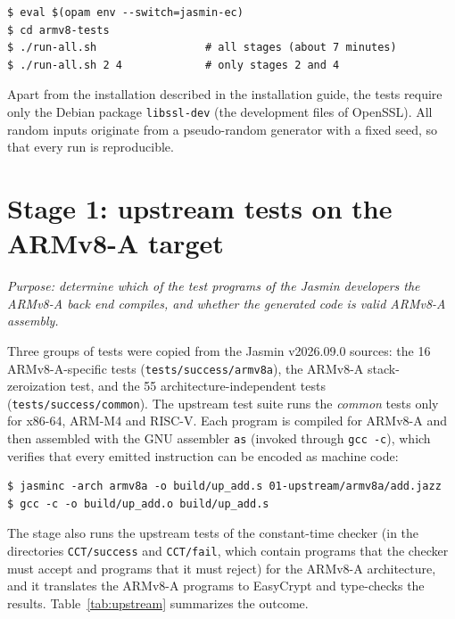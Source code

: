 \documentclass[11pt,a4paper]{article}
\newcommand{\file}[1]{\texttt{#1}}
\begin{document}
\begin{lstlisting}[style=shell]
$ eval $(opam env --switch=jasmin-ec)
$ cd armv8-tests
$ ./run-all.sh                 # all stages (about 7 minutes)
$ ./run-all.sh 2 4             # only stages 2 and 4
\end{lstlisting}

Apart from the installation described in the installation guide, the tests
require only the Debian package \texttt{libssl-dev} (the development files
of OpenSSL). All random inputs originate from a pseudo-random generator with
a fixed seed, so that every run is reproducible.

\section{Stage 1: upstream tests on the ARMv8-A target}

\emph{Purpose: determine which of the test programs of the Jasmin
developers the ARMv8-A back end compiles, and whether the generated code is
valid ARMv8-A assembly.}

Three groups of tests were copied from the Jasmin v2026.09.0 sources: the 16
ARMv8-A-specific tests (\file{tests/success/armv8a}), the ARMv8-A
stack-zeroization test, and the 55 architecture-independent tests
(\file{tests/success/common}). The upstream test suite runs the \emph{common}
tests only for x86-64, ARM-M4 and RISC-V. Each program is compiled for
ARMv8-A and then assembled with the GNU assembler \texttt{as} (invoked
through \texttt{gcc -c}), which verifies that every emitted instruction can
be encoded as machine code:

\begin{lstlisting}[style=shell]
$ jasminc -arch armv8a -o build/up_add.s 01-upstream/armv8a/add.jazz
$ gcc -c -o build/up_add.o build/up_add.s
\end{lstlisting}

The stage also runs the upstream tests of the constant-time checker (in
the directories \file{CCT/success} and \file{CCT/fail}, which contain
programs that the checker must accept and programs that it must reject)
for the ARMv8-A architecture, and it translates the ARMv8-A programs to
EasyCrypt and type-checks the results. Table~\ref{tab:upstream} summarizes
the outcome.
\end{document}
